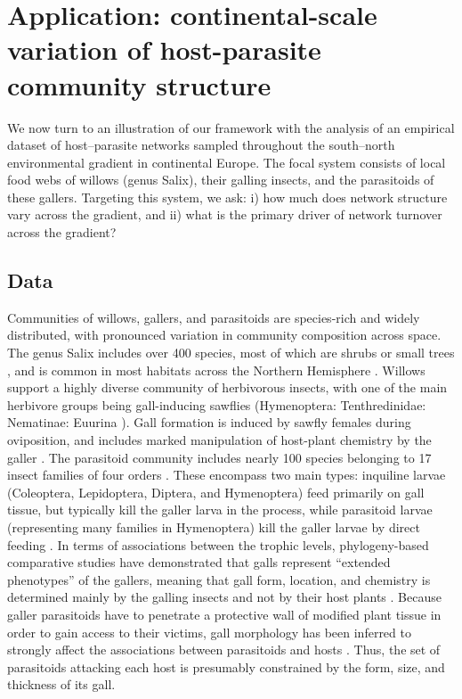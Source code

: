 \documentclass[12pt]{article}
\begin{document}

\section*{Application: continental-scale variation of host-parasite community structure}

We now turn to an illustration of our framework with the analysis of an
empirical dataset of host–parasite networks sampled throughout the south–north
environmental gradient in continental Europe. The focal system consists of
local food webs of willows (genus Salix), their galling insects, and the
parasitoids of these gallers. Targeting this system, we ask: i) how much does
network structure vary across the gradient, and ii) what is the primary driver
of network turnover across the gradient?

\subsection*{Data}

Communities of willows, gallers, and parasitoids are species-rich and
widely distributed, with pronounced variation in community composition across
space. The genus Salix includes over 400 species, most of which are shrubs or
small trees \citep{Argus1997}, and is common in most habitats across the
Northern Hemisphere \citep{Skvortsov1999}. Willows support a highly diverse
community of herbivorous insects, with one of the main herbivore groups being
gall-inducing sawflies (Hymenoptera: Tenthredinidae: Nematinae: Euurina
\citep{Kopelke1999}). Gall formation is induced by sawfly females during
oviposition, and includes marked manipulation of host-plant chemistry by the
galler \citep{Nyman2000}. The parasitoid community includes nearly
100 species belonging to 17 insect families of four orders
\citep{Kopelke2000}. These encompass two main types: inquiline larvae
(Coleoptera, Lepidoptera, Diptera, and Hymenoptera) feed primarily on gall
tissue, but typically kill the galler larva in the process, while parasitoid
larvae (representing many families in Hymenoptera) kill the galler larvae by
direct feeding \citep{Kopelke2003}. In terms of associations between the
trophic levels, phylogeny-based comparative studies have demonstrated that
galls represent ``extended phenotypes'' of the gallers, meaning that gall form,
location, and chemistry is determined mainly by the galling insects and not by
their host plants \citep{Nyman2000}. Because galler parasitoids have to
penetrate a protective wall of modified plant tissue in order to gain access
to their victims, gall morphology has been inferred to strongly affect the
associations between parasitoids and hosts \citep{Nyman2007}. Thus, the set of
parasitoids attacking each host is presumably constrained by the form,
size, and thickness of its gall.
\end{document}
